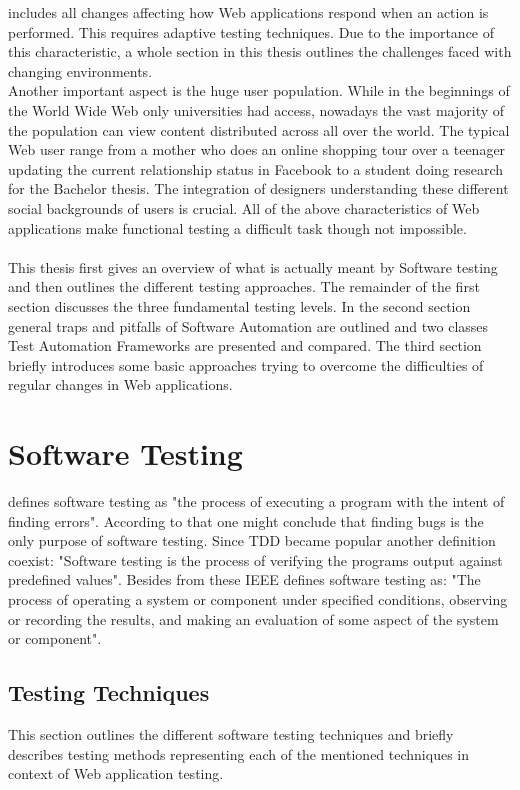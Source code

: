 \documentclass[12pt, notitlepage]{article}
\begin{document}
includes all changes affecting how Web applications respond when an action is performed. 
This requires adaptive testing techniques. Due to the importance of this characteristic, a whole section in this thesis outlines the challenges faced
with changing environments.\\ 
Another important aspect is the huge user population. While in the beginnings of the World Wide Web only universities had access,
nowadays the vast majority of the population can view content distributed across all over the world. The typical Web user range from a
mother who does an online shopping tour over a teenager updating the current relationship status in Facebook to a student doing research for
the Bachelor thesis. The integration of designers understanding these different social backgrounds of users is crucial. All of the
above characteristics of Web applications make functional testing a difficult task though not impossible.\\\\
This thesis first gives an overview of what is actually meant by Software testing and then outlines the different testing approaches. 
The remainder of the first section discusses the three fundamental testing levels. In the second section general traps and pitfalls of Software Automation are outlined and two classes Test Automation Frameworks are presented and compared. The third section briefly introduces some basic approaches trying to overcome the difficulties of regular changes in Web applications. 
\newpage


\section{Software Testing}
\cite{art-of-software-testing} defines software testing as "the process of executing a program with the intent of finding errors".
According to that one might conclude that finding bugs is the only purpose of software testing. Since TDD\cite{tdd} became popular
another definition coexist: "Software testing is the process of verifying the programs output against predefined values". Besides from 
these IEEE\cite{ieee-definition} defines software testing as: "The process of operating a system or component under specified conditions, observing or recording the results, and making an evaluation of some aspect of the system or component".\\
\subsection{Testing Techniques}
This section outlines the different software testing techniques\cite{testing-methods} and briefly describes testing methods representing each of the mentioned techniques in context of Web application testing.
\end{document}
